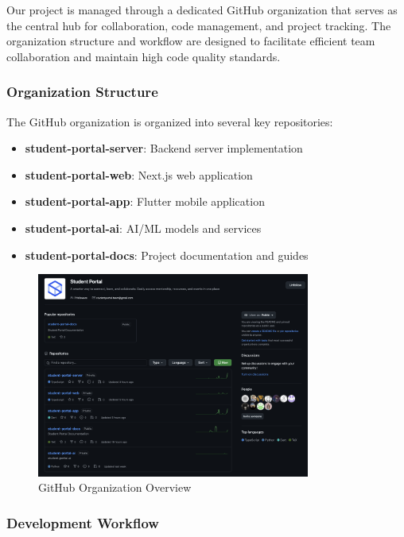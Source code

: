 Our project is managed through a dedicated GitHub organization that serves as the central hub for collaboration, code management, and project tracking. The organization structure and workflow are designed to facilitate efficient team collaboration and maintain high code quality standards.

\subsubsection{Organization Structure}
\label{subsubsec:org_structure}

The GitHub organization is organized into several key repositories:

\begin{itemize}
    \item \textbf{student-portal-server}: Backend server implementation
    \item \textbf{student-portal-web}: Next.js web application
    \item \textbf{student-portal-app}: Flutter mobile application
    \item \textbf{student-portal-ai}: AI/ML models and services
    \item \textbf{student-portal-docs}: Project documentation and guides
\end{itemize}

\begin{figure}[h]
    \centering
    \includegraphics[width=0.8\textwidth]{images/github-org-overview}
    \caption{GitHub Organization Overview}
    \label{fig:github_org}
\end{figure}

\subsubsection{Development Workflow}
\label{subsubsec:dev_workflow}

